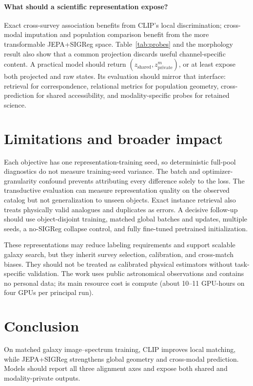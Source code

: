 \documentclass{article}
\begin{document}
\paragraph{What should a scientific representation expose?}
Exact cross-survey association benefits from CLIP's local discrimination; cross-modal imputation and population comparison benefit from the more transformable JEPA+SIGReg space.
Table~\ref{tab:probes} and the morphology result also show that a common projection discards useful channel-specific content.
A practical model should return $(z_{\mathrm{shared}},z_{\mathrm{private}}^{m})$, or at least expose both projected and raw states.
Its evaluation should mirror that interface: retrieval for correspondence, relational metrics for population geometry, cross-prediction for shared accessibility, and modality-specific probes for retained science.

\section{Limitations and broader impact}

Each objective has one representation-training seed, so deterministic full-pool diagnostics do not measure training-seed variance.
The batch and optimizer-granularity confound prevents attributing every difference solely to the loss.
The transductive evaluation can measure representation quality on the observed catalog but not generalization to unseen objects.
Exact instance retrieval also treats physically valid analogues and duplicates as errors.
A decisive follow-up should use object-disjoint training, matched global batches and updates, multiple seeds, a no-SIGReg collapse control, and fully fine-tuned pretrained initialization.

These representations may reduce labeling requirements and support scalable galaxy search, but they inherit survey selection, calibration, and cross-match biases.
They should not be treated as calibrated physical estimators without task-specific validation.
The work uses public astronomical observations and contains no personal data; its main resource cost is compute (about 10--11 GPU-hours on four GPUs per principal run).

\section{Conclusion}

On matched galaxy image--spectrum training, CLIP improves local matching, while JEPA+SIGReg strengthens global geometry and cross-modal prediction.
Models should report all three alignment axes and expose both shared and modality-private outputs.

\clearpage


\end{document}
